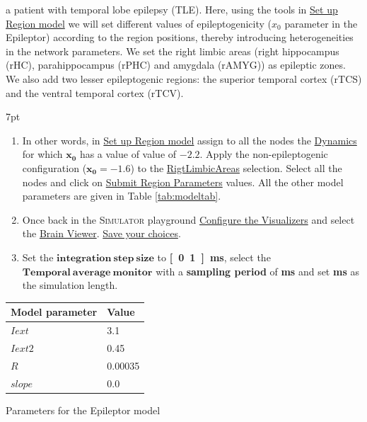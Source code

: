 \documentclass{tufte-handout}
\newenvironment{simulation}{%
  \def\FrameCommand{%
    \hspace{1pt}%
    {\color{ForestGreen}\vrule width 2pt}%
    {\color{simulationshade}\vrule width 4pt}%
    \colorbox{simulationshade}%
  }%
  \MakeFramed{\advance\hsize-\width\FrameRestore}%
  \noindent\hspace{-4.55pt}%
  \begin{adjustwidth}{}{7pt}%
  \vspace{2pt}\vspace{2pt}%
}
{%
  \vspace{2pt}\end{adjustwidth}\endMakeFramed%
}
\begin{document}
a patient with temporal lobe epilepsy (TLE). Here, using the tools in
\underline{Set up Region model} we will set different values of
epileptogenicity ($x_0$ parameter in the Epileptor) according to the region
positions, thereby introducing heterogeneities in the network parameters. We
set the right limbic areas  (right hippocampus (rHC), parahippocampus (rPHC)
and amygdala (rAMYG)) as epileptic zones. We also add two lesser epileptogenic
regions: the superior temporal cortex (rTCS) and the ventral temporal cortex
(rTCV). 


\begin{simulation}
  \begin{enumerate}
  \item In other words, in \underline{Set up Region model} assign to all the nodes the \underline{Dynamics} for which $\mathbf{x_0}$ has a value of value of $\mathbf{-2.2}$. Apply the non-epileptogenic configuration ($\mathbf{x_0}=\mathbf{-1.6}$) to the \underline{RigtLimbicAreas} selection. Select all the nodes and click on \underline{Submit Region Parameters} values.
  All the other model parameters are given in Table \ref{tab:modeltab}.

  \item Once back in the \textsc{Simulator} playground \underline{Configure the Visualizers} and select the \underline{Brain Viewer}. 
  \underline{Save your choices}.
  \item Set the $\mathbf{integration\:step\:size}$ to \textbf{\unit[0.1]{ms}}, select the $\mathbf{Temporal\:average\:monitor}$ with a \textbf{sampling period} of \textbf{\unit[1]{ms}} and set \textbf{\unit[6000]{ms}} as the simulation length. 
 \end{enumerate}
\end{simulation}

\begin{margintable}
  \centering
  \selectfont
  \begin{tabular}{ll}
    \toprule
    Model parameter & Value \\
    \midrule
             $Iext$           &   3.1     \\
             $Iext2$          &   0.45    \\
             $R$              &   0.00035 \\
             $slope$          &   0.0     \\
    \bottomrule
  \end{tabular}
  \caption{Parameters for the Epileptor model}
  \label{tab:modeltab}
\end{margintable}
\end{document}
